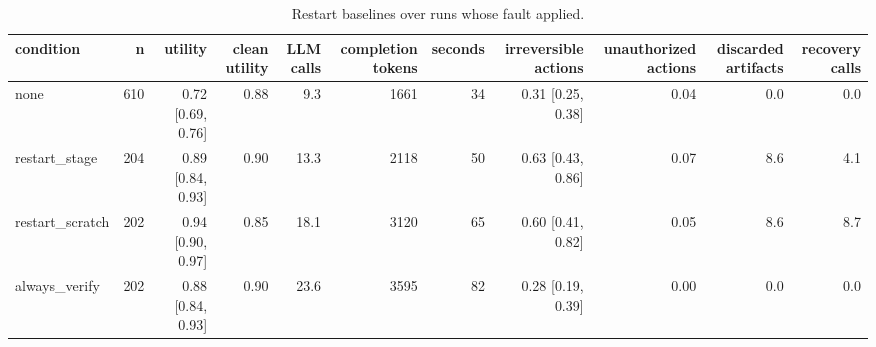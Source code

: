 \begin{table}[t]
\centering
\small
\begin{tabular}{lrrrrrrrrrr}
\toprule
condition & n & utility & clean utility & LLM calls & completion tokens & seconds & irreversible actions & unauthorized actions & discarded artifacts & recovery calls \\
\midrule
none & 610 & 0.72 [0.69, 0.76] & 0.88 & 9.3 & 1661 & 34 & 0.31 [0.25, 0.38] & 0.04 & 0.0 & 0.0 \\
restart\_stage & 204 & 0.89 [0.84, 0.93] & 0.90 & 13.3 & 2118 & 50 & 0.63 [0.43, 0.86] & 0.07 & 8.6 & 4.1 \\
restart\_scratch & 202 & 0.94 [0.90, 0.97] & 0.85 & 18.1 & 3120 & 65 & 0.60 [0.41, 0.82] & 0.05 & 8.6 & 8.7 \\
always\_verify & 202 & 0.88 [0.84, 0.93] & 0.90 & 23.6 & 3595 & 82 & 0.28 [0.19, 0.39] & 0.00 & 0.0 & 0.0 \\
\bottomrule
\end{tabular}
\caption{Restart baselines over runs whose fault applied.}
\label{tab:baselines}
\end{table}
